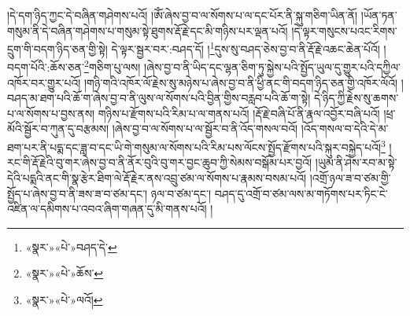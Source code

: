 །དེ་དག་ཉིད་ཀྱང་དེ་བཞིན་གཤེགས་པའོ། །ཨོཾ་ཞེས་བྱ་བ་ལ་སོགས་པ་ལ་དང་པོར་ནི་སྐུ་གཅིག་ཡིན་ནོ། །ཡོན་ཏན་གསུམ་ནི་དེ་བཞིན་གཤེགས་པ་གསུམ་སྟེ་ཐུགས་རྡོ་རྗེ་དང་མི་གཉིས་པར་ལྡན་པའོ། །དེ་ལྟར་གསུངས་པའང་རིགས་དྲུག་གི་བདག་ཉིད་ཅན་གྱི་སྟེ། དེ་ལྟར་སྦྱར་བར་:བཤད་དོ། །\footnote{«སྣར་»«པེ་»བཤད་དེ་}དུས་སུ་བཤད་ཅེས་བྱ་བ་ནི་རྡོ་རྗེ་འཆང་ཆེན་པོའོ། །བདག་པོའི་:ཆོས་ཅན་\footnote{«སྣར་»«པེ་»ཆོས་}གཅིག་པུ་ལས། །ཞེས་བྱ་བ་ནི་ཡིད་དང་ལྷན་ཅིག་ཏུ་སྐྱེས་པའི་སྤྱོད་ཡུལ་དུ་གྱུར་པའི་དཀྱིལ་འཁོར་བར་གྱུར་པའོ། །གཉི་གའི་འཁོར་ལོ་རྗེས་སུ་མཉེས་པ་ཞེས་བྱ་བ་ནི་ཕྱི་ནང་གི་བདག་ཉིད་ཅན་གྱི་འཁོར་ལོའོ། །བཤད་མ་ཐག་པའི་ཆོ་ག་ཞེས་བྱ་བ་ནི་ལུས་ལ་སོགས་པའི་བྱིན་གྱིས་བརླབ་པའི་ཆོ་ག་སྟེ། དེ་ཉིད་ཀྱི་རྗེས་སུ་ཆགས་པ་ལ་སོགས་པ་བྱས་ནས། གཉིས་པ་རྫོགས་པའི་རིམ་པ་ལ་གནས་པའོ། །རྡོ་རྗེ་བཞི་པོ་ནི་རྣལ་འབྱོར་བཞི་པའོ། །ཕྲ་མོའི་སྦྱོར་བ་ཀུན་དུ་བརྩམས། །ཞེས་བྱ་བ་ལ་སོགས་པ་ལ་སྦྱོར་བ་ནི་འོད་གསལ་བའོ། །འོད་གསལ་བ་དེའི་དེ་མ་ཐག་པར་ནི་པདྨ་དང་ཟླ་བ་དང་ཡི་གེ་གསུམ་ལ་སོགས་པའི་རིམ་པས་ལོངས་སྤྱོད་རྫོགས་པའི་སྐུར་བསྐྱེད་པའོ།\footnote{«སྣར་»«པེ་»ལའོ།} །རང་གི་རྡོ་རྗེའི་བུ་གར་ཞེས་བྱ་བ་ནི་ནོར་བུའི་བུ་གར་བྱང་ཆུབ་ཀྱི་སེམས་བསྒོམ་པར་བྱའོ། །ཡུམ་ནི་ཤེས་རབ་མ་སྟེ་དེའི་པདྨའི་ནང་གི་སྣ་རྩེར་ཐིག་ལེ་རྡོ་རྗེར་ནས་འབྲུ་ཙམ་ལ་སོགས་པ་རྣམས་བསམ་པའོ། །འགྲོ་ཉལ་ཟ་བ་ཙམ་གྱི་སྤྱོད་པ་ཞེས་བྱ་བ་ནི་ཟས་ཟ་བ་ཙམ་དང་། ཉལ་བ་ཙམ་དང་། བཤད་དུ་འགྲོ་བ་ཙམ་ལས་མ་གཏོགས་པར་ཏིང་ངེ་འཛིན་ལ་དམིགས་པ་འབའ་ཞིག་གཞན་དུ་མི་གནས་པའོ། །
